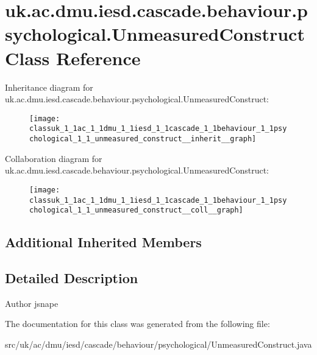 \hypertarget{classuk_1_1ac_1_1dmu_1_1iesd_1_1cascade_1_1behaviour_1_1psychological_1_1_unmeasured_construct}{\section{uk.\-ac.\-dmu.\-iesd.\-cascade.\-behaviour.\-psychological.\-Unmeasured\-Construct Class Reference}
\label{classuk_1_1ac_1_1dmu_1_1iesd_1_1cascade_1_1behaviour_1_1psychological_1_1_unmeasured_construct}
}


Inheritance diagram for uk.\-ac.\-dmu.\-iesd.\-cascade.\-behaviour.\-psychological.\-Unmeasured\-Construct\-:\nopagebreak
\begin{figure}[H]
\begin{center}
\leavevmode
\texttt{[image: classuk\_1\_1ac\_1\_1dmu\_1\_1iesd\_1\_1cascade\_1\_1behaviour\_1\_1psychological\_1\_1\_unmeasured\_construct\_\_inherit\_\_graph]}
\end{center}
\end{figure}


Collaboration diagram for uk.\-ac.\-dmu.\-iesd.\-cascade.\-behaviour.\-psychological.\-Unmeasured\-Construct\-:\nopagebreak
\begin{figure}[H]
\begin{center}
\leavevmode
\texttt{[image: classuk\_1\_1ac\_1\_1dmu\_1\_1iesd\_1\_1cascade\_1\_1behaviour\_1\_1psychological\_1\_1\_unmeasured\_construct\_\_coll\_\_graph]}
\end{center}
\end{figure}
\subsection*{Additional Inherited Members}


\subsection{Detailed Description}
\begin{DoxyAuthor}{Author}
jsnape 
\end{DoxyAuthor}


The documentation for this class was generated from the following file\-:\begin{DoxyCompactItemize}
\item 
src/uk/ac/dmu/iesd/cascade/behaviour/psychological/Unmeasured\-Construct.\-java\end{DoxyCompactItemize}
